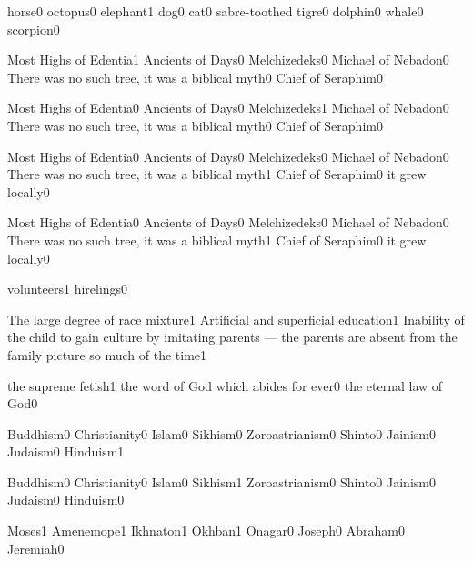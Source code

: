 {horse}{0}
{octopus}{0}
{elephant}{1}
{dog}{0}
{cat}{0}
{sabre-toothed tigre}{0}
{dolphin}{0}
{whale}{0}
{scorpion}{0}
\qstop

{Most Highs of Edentia}{1}
{Ancients of Days}{0}
{Melchizedeks}{0}
{Michael of Nebadon}{0}
{There was no such tree, it was a biblical myth}{0}
{Chief of Seraphim}{0}
\qstop

{Most Highs of Edentia}{0}
{Ancients of Days}{0}
{Melchizedeks}{1}
{Michael of Nebadon}{0}
{There was no such tree, it was a biblical myth}{0}
{Chief of Seraphim}{0}
\qstop

{Most Highs of Edentia}{0}
{Ancients of Days}{0}
{Melchizedeks}{0}
{Michael of Nebadon}{0}
{There was no such tree, it was a biblical myth}{1}
{Chief of Seraphim}{0}
{it grew locally}{0}
\qstop

{Most Highs of Edentia}{0}
{Ancients of Days}{0}
{Melchizedeks}{0}
{Michael of Nebadon}{0}
{There was no such tree, it was a biblical myth}{1}
{Chief of Seraphim}{0}
{it grew locally}{0}
\qstop

{volunteers}{1}
{hirelings}{0}
\qstop

{The large degree of race mixture}{1}
{Artificial and superficial education}{1}
{Inability of the child to gain culture by imitating parents --- the parents are absent from the family picture so much of the time}{1}
\qstop

{the supreme fetish}{1}
{the word of God which abides for ever}{0}
{the eternal law of God}{0}
\qstop

{Buddhism}{0}
{Christianity}{0}
{Islam}{0}
{Sikhism}{0}
{Zoroastrianism}{0}
{Shinto}{0}
{Jainism}{0}
{Judaism}{0}
{Hinduism}{1}
\qstop

{Buddhism}{0}
{Christianity}{0}
{Islam}{0}
{Sikhism}{1}
{Zoroastrianism}{0}
{Shinto}{0}
{Jainism}{0}
{Judaism}{0}
{Hinduism}{0}
\qstop

{Moses}{1}
{Amenemope}{1}
{Ikhnaton}{1}
{Okhban}{1}
{Onagar}{0}
{Joseph}{0}
{Abraham}{0}
{Jeremiah}{0}
\qstop

